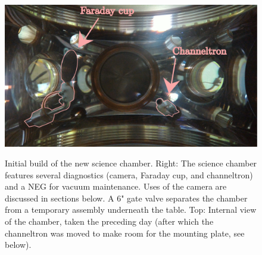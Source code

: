 	\begin{figure}
	  \begin{minipage}{0.55\textwidth} %
	  \vspace{0pt}
			\includegraphics[width=\textwidth]{fig/lattice/science_chamber_internal}
		   {\begin{flushright}\caption{Initial build of the new science chamber.
	Right: The science chamber features several diagnostics (camera, Faraday cup, and channeltron) and a NEG for vacuum maintenance.
	Uses of the camera are discussed in sections below.
	A 6" gate valve separates the chamber from a temporary assembly underneath the table.
	Top: Internal view of the chamber, taken the preceding day (after which the channeltron was moved to make room for the mounting plate, see below).}\end{flushright}\label{fig:first_build}}
	  \end{minipage}
	  \hfill
	  \begin{minipage}{0.45\textwidth}
	  \vspace{0pt}

\end{minipage}
\end{figure}
